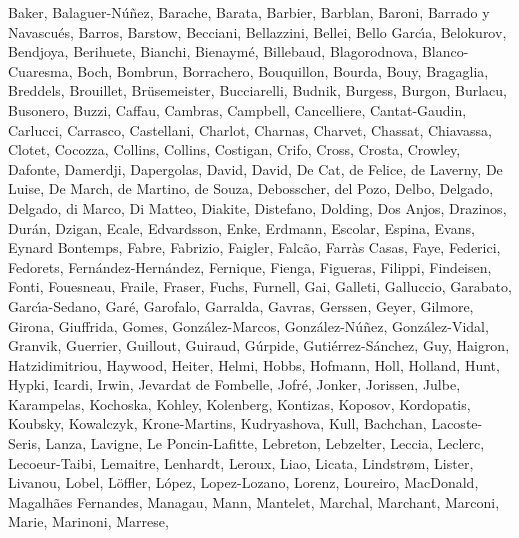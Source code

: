 \documentclass[onecolumn]{aa}
\begin{document}
\begin{thebibliography}{149}
{		{Baker}, {Balaguer-N{\'u}{\~n}ez}, {Barache}, {Barata}, {Barbier}, {Barblan},
		{Baroni}, {Barrado y Navascu{\'e}s}, {Barros}, {Barstow}, {Becciani},
		{Bellazzini}, {Bellei}, {Bello Garc{\'\i}a}, {Belokurov}, {Bendjoya},
		{Berihuete}, {Bianchi}, {Bienaym{\'e}}, {Billebaud}, {Blagorodnova},
		{Blanco-Cuaresma}, {Boch}, {Bombrun}, {Borrachero}, {Bouquillon}, {Bourda},
		{Bouy}, {Bragaglia}, {Breddels}, {Brouillet}, {Br{\"u}semeister},
		{Bucciarelli}, {Budnik}, {Burgess}, {Burgon}, {Burlacu}, {Busonero}, {Buzzi},
		{Caffau}, {Cambras}, {Campbell}, {Cancelliere}, {Cantat-Gaudin}, {Carlucci},
		{Carrasco}, {Castellani}, {Charlot}, {Charnas}, {Charvet}, {Chassat},
		{Chiavassa}, {Clotet}, {Cocozza}, {Collins}, {Collins}, {Costigan}, {Crifo},
		{Cross}, {Crosta}, {Crowley}, {Dafonte}, {Damerdji}, {Dapergolas}, {David},
		{David}, {De Cat}, {de Felice}, {de Laverny}, {De Luise}, {De March}, {de
			Martino}, {de Souza}, {Debosscher}, {del Pozo}, {Delbo}, {Delgado},
		{Delgado}, {di Marco}, {Di Matteo}, {Diakite}, {Distefano}, {Dolding}, {Dos
			Anjos}, {Drazinos}, {Dur{\'a}n}, {Dzigan}, {Ecale}, {Edvardsson}, {Enke},
		{Erdmann}, {Escolar}, {Espina}, {Evans}, {Eynard Bontemps}, {Fabre},
		{Fabrizio}, {Faigler}, {Falc{\~a}o}, {Farr{\`a}s Casas}, {Faye}, {Federici},
		{Fedorets}, {Fern{\'a}ndez-Hern{\'a}ndez}, {Fernique}, {Fienga}, {Figueras},
		{Filippi}, {Findeisen}, {Fonti}, {Fouesneau}, {Fraile}, {Fraser}, {Fuchs},
		{Furnell}, {Gai}, {Galleti}, {Galluccio}, {Garabato}, {Garc{\'\i}a-Sedano},
		{Gar{\'e}}, {Garofalo}, {Garralda}, {Gavras}, {Gerssen}, {Geyer}, {Gilmore},
		{Girona}, {Giuffrida}, {Gomes}, {Gonz{\'a}lez-Marcos},
		{Gonz{\'a}lez-N{\'u}{\~n}ez}, {Gonz{\'a}lez-Vidal}, {Granvik}, {Guerrier},
		{Guillout}, {Guiraud}, {G{\'u}rpide}, {Guti{\'e}rrez-S{\'a}nchez}, {Guy},
		{Haigron}, {Hatzidimitriou}, {Haywood}, {Heiter}, {Helmi}, {Hobbs},
		{Hofmann}, {Holl}, {Holland}, {Hunt}, {Hypki}, {Icardi}, {Irwin}, {Jevardat
			de Fombelle}, {Jofr{\'e}}, {Jonker}, {Jorissen}, {Julbe}, {Karampelas},
		{Kochoska}, {Kohley}, {Kolenberg}, {Kontizas}, {Koposov}, {Kordopatis},
		{Koubsky}, {Kowalczyk}, {Krone-Martins}, {Kudryashova}, {Kull}, {Bachchan},
		{Lacoste-Seris}, {Lanza}, {Lavigne}, {Le Poncin-Lafitte}, {Lebreton},
		{Lebzelter}, {Leccia}, {Leclerc}, {Lecoeur-Taibi}, {Lemaitre}, {Lenhardt},
		{Leroux}, {Liao}, {Licata}, {Lindstr{\o}m}, {Lister}, {Livanou}, {Lobel},
		{L{\"o}ffler}, {L{\'o}pez}, {Lopez-Lozano}, {Lorenz}, {Loureiro},
		{MacDonald}, {Magalh{\~a}es Fernandes}, {Managau}, {Mann}, {Mantelet},
		{Marchal}, {Marchant}, {Marconi}, {Marie}, {Marinoni}, {Marrese},
}
\end{thebibliography}
\end{document}
